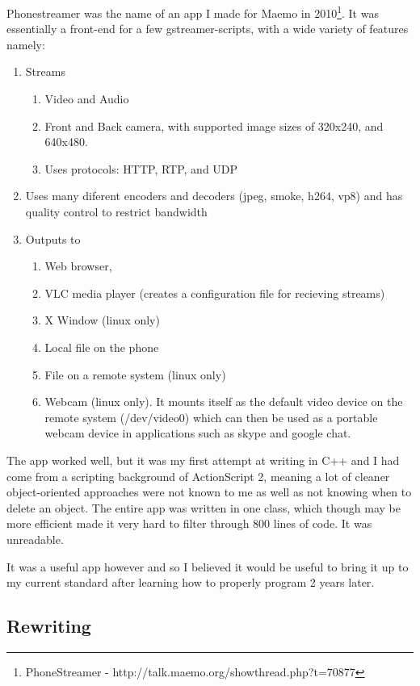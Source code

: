 Phonestreamer was the name of an app I made for Maemo in 2010\footnote{PhoneStreamer - http://talk.maemo.org/showthread.php?t=70877}\label{ref:phonstreamer}. It was essentially a front-end for a few gstreamer-scripts, with a wide variety of features namely:
\begin{enumerate}
\item Streams
	\begin{enumerate}
	\item Video and Audio
	\item Front and Back camera, with supported image sizes of 320x240, and 640x480.
	\item Uses protocols: HTTP, RTP, and UDP
	\end{enumerate}
\item Uses many diferent encoders and decoders (jpeg, smoke, h264, vp8)  and has quality control to restrict bandwidth
\item Outputs to
	\begin{enumerate}
	\item Web browser,
	\item VLC media player (creates a configuration file for recieving streams)
	\item X Window (linux only)
	\item Local file on the phone
	\item File on a remote system (linux only)
	\item Webcam (linux only). It mounts itself as the default video device on the remote system (/dev/video0) which can then be used as a portable webcam device in applications such as skype and google chat.
	\end{enumerate}
\end{enumerate}

The app worked well, but it was my first attempt at writing in C++ and I had come from a scripting background of ActionScript 2, meaning a lot of cleaner object-oriented approaches were not known to me as well as not knowing when to delete an object. The entire app was written in one class, which though may be more efficient made it very hard to filter through 800 lines of code. It was unreadable.

It was a useful app however and so I believed it would be useful to bring it up to my current standard after learning how to properly program 2 years later.

\subsection{Rewriting}

